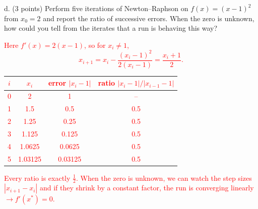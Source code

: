 \documentclass[11pt]{article}
\begin{document}
d. (3 points) Perform five iterations of Newton--Raphson on $f(x)=(x-1)^2$ from $x_0=2$ and report
the ratio of successive errors. When the zero is unknown, how could you tell from the iterates
that a run is behaving this way?

\textcolor{red}{
Here $f'(x) = 2(x-1)$, so for $x_i \ne 1$,
\[
x_{i+1} = x_i - \frac{(x_i - 1)^2}{2(x_i - 1)} = \frac{x_i + 1}{2}.
\]
\begin{center}
\begin{tabular}{cccc}
$i$ & $x_i$ & error $|x_i - 1|$ & ratio $|x_i - 1|/|x_{i-1} - 1|$ \\ \hline
0 & 2 & 1 & -- \\
1 & 1.5 & 0.5 & 0.5 \\
2 & 1.25 & 0.25 & 0.5 \\
3 & 1.125 & 0.125 & 0.5 \\
4 & 1.0625 & 0.0625 & 0.5 \\
5 & 1.03125 & 0.03125 & 0.5
\end{tabular}
\end{center}
Every ratio is exactly $\tfrac12$. When the zero is unknown, we can watch the step sizes $|x_{i+1} - x_i|$ and if they shrink by a constant factor, the run is converging linearly $\rightarrow f'(x^*) = 0$.
}
\end{document}
